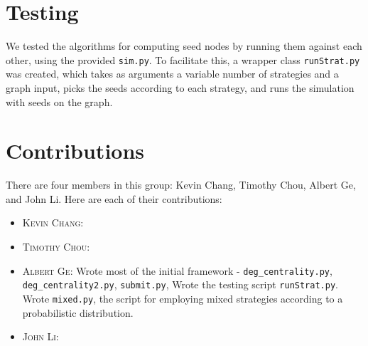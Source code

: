 \documentclass{article}
\begin{document}
\section{Testing}
    We tested the algorithms for computing seed nodes by running them against
    each other, using the provided \texttt{sim.py}. To facilitate this,
    a wrapper class \texttt{runStrat.py} was created, which takes as arguments
    a variable number of strategies and a graph input, picks the seeds according to each strategy,
    and runs the simulation with seeds on the graph.



 

\section{Contributions}
There are four members in this group: Kevin Chang, Timothy Chou, Albert Ge, and John Li. Here are each of their contributions:
\begin{itemize}
  \item \textsc{Kevin Chang}: 
  \item \textsc{Timothy Chou}: 
  \item \textsc{Albert Ge}: Wrote most of the initial framework - \texttt{deg\_centrality.py},
  \texttt{deg\_centrality2.py}, \texttt{submit.py}, 
  Wrote the testing script \texttt{runStrat.py}. 
  Wrote \texttt{mixed.py}, the script for employing mixed strategies according to
  a probabilistic distribution.
  \item \textsc{John Li}: 
 \end{itemize}




\end{document}
